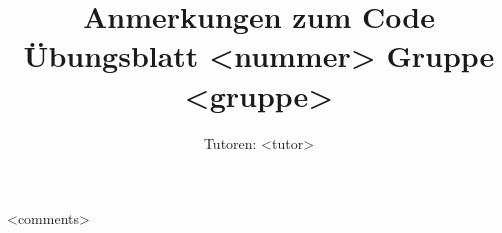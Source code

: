 \documentclass[a4paper,10pt]{scrartcl}
\title{Anmerkungen zum Code\\ Übungsblatt <nummer> Gruppe <gruppe>}
\author{Tutoren: <tutor>}
\begin{document}
\maketitle

<comments>
\end{document}
